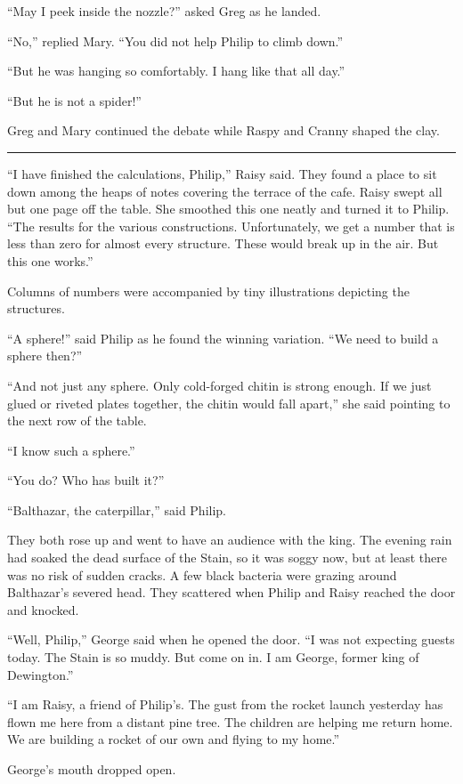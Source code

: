 \documentclass[10pt, draft]{memoir}
\renewcommand{\pfbreakdisplay}{\bigskip \ding{166} \bigskip}
\newcommand{\secbreak}{\fancybreak{\pfbreakdisplay}}
\begin{document}
``May I peek inside the nozzle?'' asked Greg as he landed.

``No,'' replied Mary. ``You did not help Philip to climb down.''

``But he was hanging so comfortably. I hang like that all day.''

``But he is not a spider!''

Greg and Mary continued the debate while Raspy and Cranny shaped the clay.

\secbreak

``I have finished the calculations, Philip,'' Raisy said. They found a place to
sit down among the heaps of notes covering the terrace of the cafe. Raisy swept
all but one page off the table. She smoothed this one neatly and turned it to
Philip. ``The results for the various constructions. Unfortunately, we get a
number that is less than zero for almost every structure. These would break up
in the air. But this one works.''

Columns of numbers were accompanied by tiny illustrations depicting the
structures.

``A sphere!'' said Philip as he found the winning variation. ``We need to build
a sphere then?''

``And not just any sphere. Only cold-forged chitin is strong enough. If we just
glued or riveted plates together, the chitin would fall apart,'' she said
pointing to the next row of the table.

``I know such a sphere.''

``You do? Who has built it?''

``Balthazar, the caterpillar,'' said Philip.

They both rose up and went to have an audience with the king. The evening rain
had soaked the dead surface of the Stain, so it was soggy now, but at least
there was no risk of sudden cracks. A few black bacteria were grazing around
Balthazar's severed head. They scattered when Philip and Raisy reached the door
and knocked.

``Well, Philip,'' George said when he opened the door. ``I was not expecting
guests today. The Stain is so muddy. But come on in. I am George, former king
of Dewington.''

``I am Raisy, a friend of Philip's. The gust from the rocket launch yesterday
has flown me here from a distant pine tree. The children are helping me return
home. We are building a rocket of our own and flying to my home.''

George's mouth dropped open.
\end{document}
